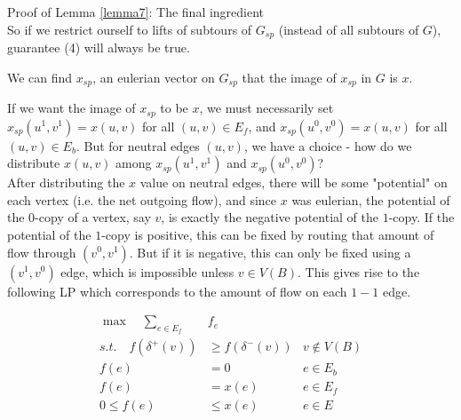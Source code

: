 \documentclass[./main.tex]{subfiles}
\begin{document}
\begin{subsection}{Proof of Lemma \ref{lemma7}: The final ingredient}
		\\So if we restrict ourself to lifts of subtours of $G_{sp}$ (instead of all subtours of $G$), guarantee (4) will always be true.\vspace{2mm}
		\begin{lemma}
			We can find $x_{sp}$, an eulerian vector on $G_{sp}$ that the image of $x_{sp}$ in $G$ is $x$.
		\end{lemma}
		If we want the image of $x_{sp}$ to be $x$, we must necessarily set $x_{sp}(u^1,v^1)=x(u,v)$ for all $(u,v)\in E_f$, and $x_{sp}(u^0,v^0) = x(u,v)$ for all $(u,v)\in E_b$. But for neutral edges $(u,v)$, we have a choice - how do we distribute $x(u,v)$ among $x_{sp}(u^1,v^1)$ and $x_{sp}(u^0,v^0)$?\vspace{2mm}
		\\After distributing the $x$ value on neutral edges, there will be some "potential" on each vertex (i.e. the net outgoing flow), and since $x$ was eulerian, the potential of the $0$-copy of a vertex, say $v$, is exactly the negative potential of the $1$-copy.
		If the potential of the $1$-copy is positive, this can be fixed by routing that amount of flow through $(v^0,v^1)$. But if it is negative, this can only be fixed using a $(v^1,v^0)$ edge, which is impossible unless $v\in V(B)$. This gives rise to the following LP which corresponds to the amount of flow on each $1-1$ edge.
		\begin{minipage}{0.60\textwidth}
		\begin{align*}
			\max\quad\sum_{e\in E_f}&f_e\\
			s.t.\quad f(\delta^+(v))&\geq f(\delta^-(v))   &v\notin V(B)              \\
			f(e)&=0  &e\in E_b\\
			f(e) &= x(e)  &e\in E_f\\
			0\leq f(e)&\leq x(e) &e\in E\\
		\end{align*}
		\end{minipage}
	\end{subsection}
	
\end{document}

